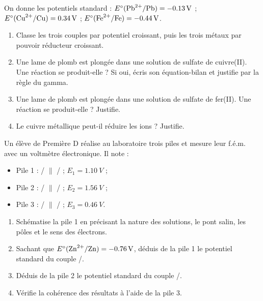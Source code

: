\documentclass[11pt]{article}
\begin{document}
\begin{exercice}
On donne les potentiels standard : $E^{\circ}(\ce{Pb^2+}/\ce{Pb}) = \SI{-0,13}{V}$ ; $E^{\circ}(\ce{Cu^2+}/\ce{Cu}) = \SI{+0,34}{V}$ ; $E^{\circ}(\ce{Fe^2+}/\ce{Fe}) = \SI{-0,44}{V}$.
\begin{enumerate}
\item Classe les trois couples par potentiel croissant, puis les trois métaux par pouvoir réducteur croissant.
\item Une lame de plomb est plongée dans une solution de sulfate de cuivre(II). Une réaction se produit-elle ? Si oui, écris son équation-bilan et justifie par la règle du gamma.
\item Une lame de plomb est plongée dans une solution de sulfate de fer(II). Une réaction se produit-elle ? Justifie.
\item Le cuivre métallique peut-il réduire les ions  ? Justifie.
\end{enumerate}
\end{exercice}

\begin{exercice}
Un élève de Première D réalise au laboratoire trois piles et mesure leur f.é.m. avec un voltmètre électronique. Il note :
\begin{itemize}
\item Pile 1 : / $\parallel$ / ; $E_1 = \SI{1,10}{V}$ ;
\item Pile 2 : / $\parallel$ / ; $E_2 = \SI{1,56}{V}$ ;
\item Pile 3 : / $\parallel$ / ; $E_3 = \SI{0,46}{V}$.
\end{itemize}
\begin{enumerate}
\item Schématise la pile 1 en précisant la nature des solutions, le pont salin, les pôles et le sens des électrons.
\item Sachant que $E^{\circ}(\ce{Zn^2+}/\ce{Zn}) = \SI{-0,76}{V}$, déduis de la pile 1 le potentiel standard du couple /.
\item Déduis de la pile 2 le potentiel standard du couple /.
\item Vérifie la cohérence des résultats à l'aide de la pile 3.
\end{enumerate}
\end{exercice}
\end{document}
